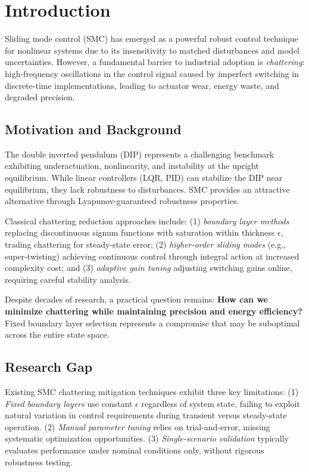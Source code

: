 \documentclass[conference]{IEEEtran}
\begin{document}
\section{Introduction}

Sliding mode control (SMC) has emerged as a powerful robust control technique for nonlinear systems due to its insensitivity to matched disturbances and model uncertainties. However, a fundamental barrier to industrial adoption is \emph{chattering}: high-frequency oscillations in the control signal caused by imperfect switching in discrete-time implementations, leading to actuator wear, energy waste, and degraded precision.

\subsection{Motivation and Background}

The double inverted pendulum (DIP) represents a challenging benchmark exhibiting underactuation, nonlinearity, and instability at the upright equilibrium. While linear controllers (LQR, PID) can stabilize the DIP near equilibrium, they lack robustness to disturbances. SMC provides an attractive alternative through Lyapunov-guaranteed robustness properties.

Classical chattering reduction approaches include: (1) \emph{boundary layer methods} replacing discontinuous signum functions with saturation within thickness $\epsilon$, trading chattering for steady-state error; (2) \emph{higher-order sliding modes} (e.g., super-twisting) achieving continuous control through integral action at increased complexity cost; and (3) \emph{adaptive gain tuning} adjusting switching gains online, requiring careful stability analysis.

Despite decades of research, a practical question remains: \textbf{How can we minimize chattering while maintaining precision and energy efficiency?} Fixed boundary layer selection represents a compromise that may be suboptimal across the entire state space.

\subsection{Research Gap}

Existing SMC chattering mitigation techniques exhibit three key limitations: (1) \emph{Fixed boundary layers} use constant $\epsilon$ regardless of system state, failing to exploit natural variation in control requirements during transient versus steady-state operation. (2) \emph{Manual parameter tuning} relies on trial-and-error, missing systematic optimization opportunities. (3) \emph{Single-scenario validation} typically evaluates performance under nominal conditions only, without rigorous robustness testing.
\end{document}

